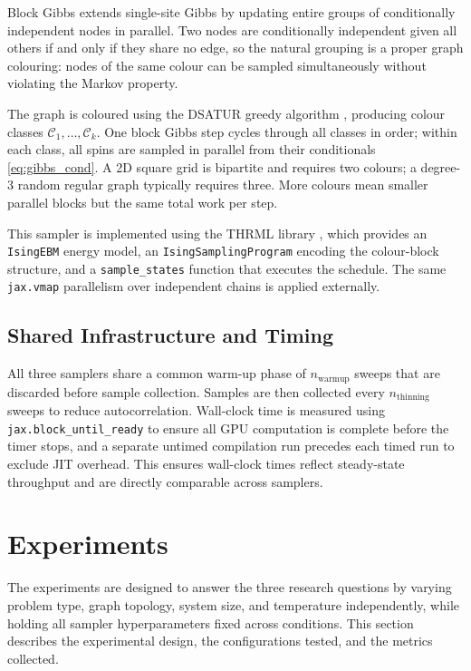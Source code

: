 \documentclass[conference]{IEEEtran}
\begin{document}
Block Gibbs extends single-site Gibbs by updating entire groups of conditionally independent nodes in parallel. Two nodes are conditionally independent given all others if and only if they share no edge, so the natural grouping is a proper graph colouring: nodes of the same colour can be sampled simultaneously without violating the Markov property.

The graph is coloured using the DSATUR greedy algorithm \cite{brelaz1979}, producing colour classes $\mathcal{C}_1, \ldots, \mathcal{C}_k$. One block Gibbs step cycles through all classes in order; within each class, all spins are sampled in parallel from their conditionals \eqref{eq:gibbs_cond}. A 2D square grid is bipartite and requires two colours; a degree-3 random regular graph typically requires three. More colours mean smaller parallel blocks but the same total work per step.

This sampler is implemented using the THRML library \cite{thrml}, which provides an \texttt{IsingEBM} energy model, an \texttt{IsingSamplingProgram} encoding the colour-block structure, and a \texttt{sample\_states} function that executes the schedule. The same \texttt{jax.vmap} parallelism over independent chains is applied externally.

\subsection{Shared Infrastructure and Timing}

All three samplers share a common warm-up phase of $n_{\mathrm{warmup}}$ sweeps that are discarded before sample collection. Samples are then collected every $n_{\mathrm{thinning}}$ sweeps to reduce autocorrelation. Wall-clock time is measured using \texttt{jax.block\_until\_ready} to ensure all GPU computation is complete before the timer stops, and a separate untimed compilation run precedes each timed run to exclude JIT overhead. This ensures wall-clock times reflect steady-state throughput and are directly comparable across samplers.

\section{Experiments}\label{sec:experiments}

The experiments are designed to answer the three research questions by varying problem type, graph topology, system size, and temperature independently, while holding all sampler hyperparameters fixed across conditions. This section describes the experimental design, the configurations tested, and the metrics collected.
\end{document}
